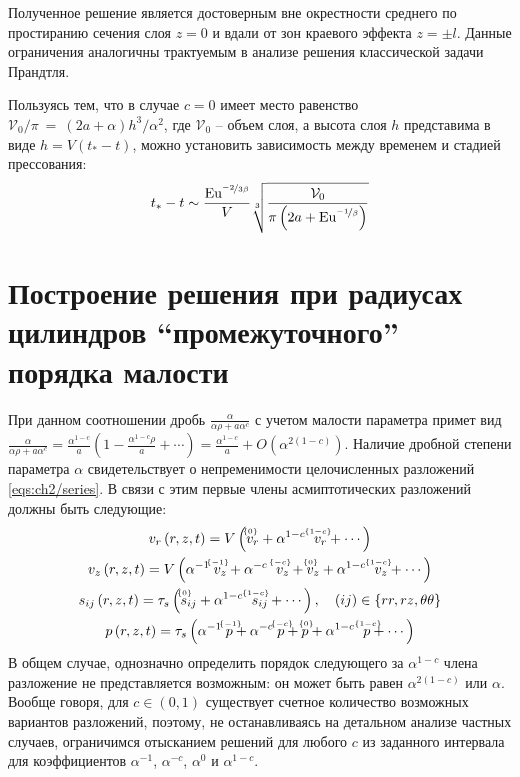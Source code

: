 Полученное решение является достоверным вне окрестности среднего по простиранию сечения слоя $z=0$ и вдали от зон краевого эффекта $z=\pm l$. Данные ограничения аналогичны трактуемым в анализе решения классической задачи Прандтля.

Пользуясь тем, что в случае $c=0$ имеет место равенство $\mathcal{V}_0 / \pi~=~\left(2a + \alpha\right) h^{3} / \alpha^{2}$, где $\mathcal{V}_0$ -- объем слоя, а высота слоя $h$ представима в виде $h=V \left(t_*-t\right)$, можно установить зависимость между временем и стадией прессования:
\begin{equation}
  t_* - t \sim \frac{\text{Eu}^{\nicefrac{-2}{3\beta}}}{V}\sqrt[3]{\frac{\mathcal{V}_0}{\pi\left(2a+\text{Eu}^{\nicefrac{-1}{\beta}}\right)}}
\end{equation}

\section{Построение решения при радиусах цилиндров ``промежуточного'' порядка малости}\label{sec:ch2/sec6}

При данном соотношении дробь $\frac{\alpha}{\alpha\rho+a \alpha^c}$ с учетом малости параметра примет вид $\frac{\alpha}{\alpha\rho+a \alpha^c} = \frac{\alpha^{1-c}}{a}\left(1-\frac{\alpha^{1-c}\rho}{a}+\cdots\right) = \frac{\alpha^{1-c}}{a} + O\left(\alpha^{2\left(1-c\right)}\right)$.
Наличие дробной степени параметра $\alpha$ свидетельствует о непременимости целочисленных разложений \cref{eqs:ch2/series}. В связи с этим первые члены асмиптотических разложений должны быть следующие:
\begin{subequations}
  \label{eqs:ch2/sec6/series}
  \begin{gather}
    v_{r}\left(r, z, t\right) = V \left(\uindex{v}{0}_{r} + \alpha^{1-c} \;\ \uindex{v}{1-c}_{r} + \cdots\right)
    \\
    v_{z}\left(r, z, t\right) = V \left(\alpha^{-1} \; \uindex{v}{-1}_{z} + \alpha^{-c} \;\ \uindex{v}{-c}_{z} + \uindex{v}{0}_{z} + \alpha^{1-c} \;\ \uindex{v}{1-c}_{z} + \cdots\right)
    \\
    s_{ij}\left(r, z, t\right) = \tau_{s} \left(\uindex{s}{0}_{ij} + \alpha^{1-c} \;\ \uindex{s}{1-c}_{ij} + \cdots\right), \quad (ij)\in\{rr, rz, \theta\theta\}
    \\
    p\left(r, z, t \right) = \tau_{s} \left(\alpha^{-1} \; \uindex{p}{-1} + \alpha^{-c} \; \uindex{p}{-c} + \uindex{p}{0} + \alpha^{1-c} \;\ \uindex{p}{1-c} + \cdots\right)
  \end{gather}
\end{subequations}
В общем случае, однозначно определить порядок следующего за $\alpha^{1-c}$ члена разложение не представляется возможным: он может быть равен $\alpha^{2(1-c)}$ или $\alpha$. Вообще говоря, для $c\in(0,1)$ существует счетное количество возможных вариантов разложений, поэтому, не останавливаясь на детальном анализе частных случаев, ограничимся отысканием решений для любого $c$ из заданного интервала для коэффициентов $\alpha^{-1}$, $\alpha^{-c}$, $\alpha^0$ и $\alpha^{1-c}$. 
